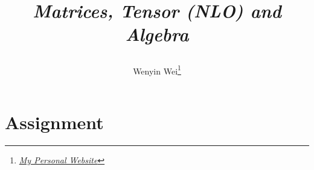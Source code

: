 \documentclass[10pt]{article}
\title{\begin{center}{\Huge \textit{Matrices, Tensor (NLO) and Algebra}}\end{center}}
\author{Wenyin Wei\footnote{\href{https://wenyin.xyz/}{\textit{My Personal Website}}}}
\affiliation{
Tsinghua University\\
Department of Engineering Physics
}
\begin{document}
	\maketitle
	\flushbottom
	\newpage
	\pagestyle{fancynotes}

	\section{Assignment}
	
	
	
\end{document}
